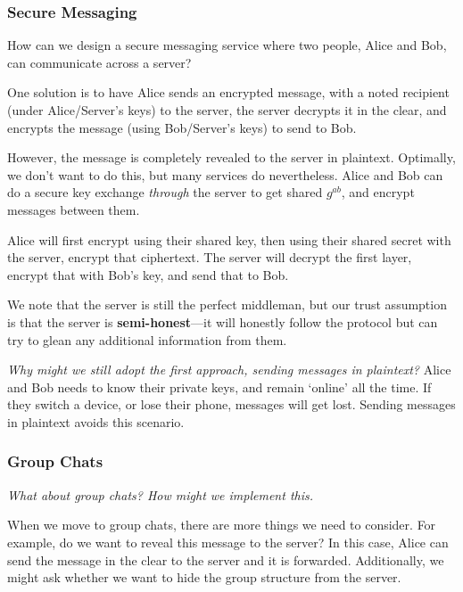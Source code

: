 \subsubsection{Secure Messaging}\label{sec:feb23-secure-messaging}
How can we design a secure messaging service where two people, Alice and Bob, can communicate across a server?

One solution is to have Alice sends an encrypted message, with a noted recipient (under Alice/Server's keys) to the server, the server decrypts it in the clear, and encrypts the message (using Bob/Server's keys) to send to Bob.

However, the message is completely revealed to the server in plaintext. Optimally, we don't want to do this, but many services do nevertheless. Alice and Bob can do a secure key exchange \emph{through} the server to get shared $g^{ab}$, and encrypt messages between them.

Alice will first encrypt using their shared key, then using their shared secret with the server, encrypt that ciphertext. The server will decrypt the first layer, encrypt that with Bob's key, and send that to Bob.

We note that the server is still the perfect middleman, but our trust assumption is that the server is \textbf{semi-honest}---it will honestly follow the protocol but can try to glean any additional information from them.


\emph{Why might we still adopt the first approach, sending messages in plaintext?} Alice and Bob needs to know their private keys, and remain `online' all the time. If they switch a device, or lose their phone, messages will get lost. Sending messages in plaintext avoids this scenario.

\subsubsection{Group Chats}
\emph{What about group chats? How might we implement this.}

When we move to group chats, there are more things we need to consider. For example, do we want to reveal this message to the server? In this case, Alice can send the message in the clear to the server and it is forwarded. Additionally, we might ask whether we want to hide the group structure from the server.


